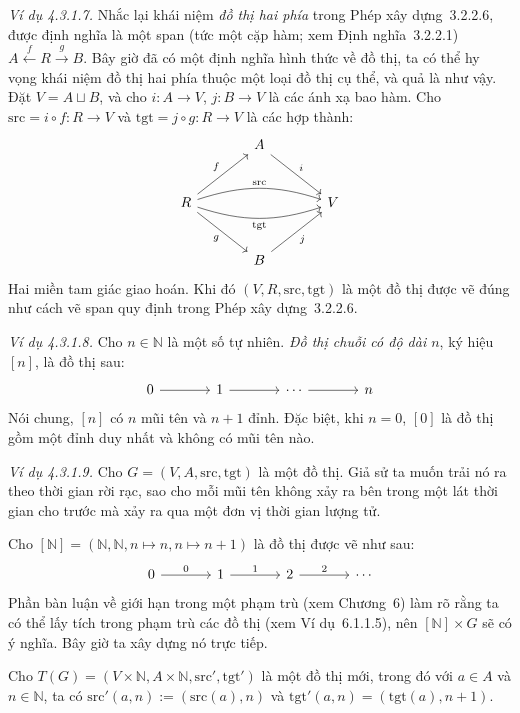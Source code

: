 \noindent\textit{Ví dụ 4.3.1.7.} Nhắc lại khái niệm \emph{đồ thị hai phía} trong Phép xây dựng~3.2.2.6, được định nghĩa là một span (tức một cặp hàm; xem Định nghĩa~3.2.2.1) $A\xleftarrow{f}R\xrightarrow{g}B$. Bây giờ đã có một định nghĩa hình thức về đồ thị, ta có thể hy vọng khái niệm đồ thị hai phía thuộc một loại đồ thị cụ thể, và quả là như vậy. Đặt $V=A\sqcup B$, và cho $i:A\to V$, $j:B\to V$ là các ánh xạ bao hàm. Cho $\mathrm{src}=i\circ f:R\to V$ và $\mathrm{tgt}=j\circ g:R\to V$ là các hợp thành:
\[
\begin{tikzcd}[column sep=large,row sep=large]
&A\arrow[dr,"i"]&\\
R\arrow[ur,"f"]\arrow[dr,"g"']\arrow[rr,bend left=18,"\mathrm{src}"]\arrow[rr,bend right=18,"\mathrm{tgt}"']&&V\\
&B\arrow[ur,"j"']&
\end{tikzcd}
\]
Hai miền tam giác giao hoán. Khi đó $(V,R,\mathrm{src},\mathrm{tgt})$ là một đồ thị được vẽ đúng như cách vẽ span quy định trong Phép xây dựng~3.2.2.6.

\noindent\textit{Ví dụ 4.3.1.8.} Cho $n\in\mathbb{N}$ là một số tự nhiên. \emph{Đồ thị chuỗi có độ dài $n$}, ký hiệu $[n]$, là đồ thị sau:
\[
\begin{tikzcd}[column sep=large]
0\arrow[r]&1\arrow[r]&\cdots\arrow[r]&n
\end{tikzcd}
\]
Nói chung, $[n]$ có $n$ mũi tên và $n+1$ đỉnh. Đặc biệt, khi $n=0$, $[0]$ là đồ thị gồm một đỉnh duy nhất và không có mũi tên nào.

\noindent\textit{Ví dụ 4.3.1.9.} Cho $G=(V,A,\mathrm{src},\mathrm{tgt})$ là một đồ thị. Giả sử ta muốn trải nó ra theo thời gian rời rạc, sao cho mỗi mũi tên không xảy ra bên trong một lát thời gian cho trước mà xảy ra qua một đơn vị thời gian lượng tử.

Cho $[\mathbb{N}]=(\mathbb{N},\mathbb{N},n\mapsto n,n\mapsto n+1)$ là đồ thị được vẽ như sau:
\[
\begin{tikzcd}[column sep=large]
0\arrow[r,"0"]&1\arrow[r,"1"]&2\arrow[r,"2"]&\cdots
\end{tikzcd}
\]
Phần bàn luận về giới hạn trong một phạm trù (xem Chương~6) làm rõ rằng ta có thể lấy tích trong phạm trù các đồ thị (xem Ví dụ~6.1.1.5), nên $[\mathbb{N}]\times G$ sẽ có ý nghĩa. Bây giờ ta xây dựng nó trực tiếp.

Cho $T(G)=(V\times\mathbb{N},A\times\mathbb{N},\mathrm{src}',\mathrm{tgt}')$ là một đồ thị mới, trong đó với $a\in A$ và $n\in\mathbb{N}$, ta có $\mathrm{src}'(a,n):=(\mathrm{src}(a),n)$ và $\mathrm{tgt}'(a,n)=(\mathrm{tgt}(a),n+1)$.

